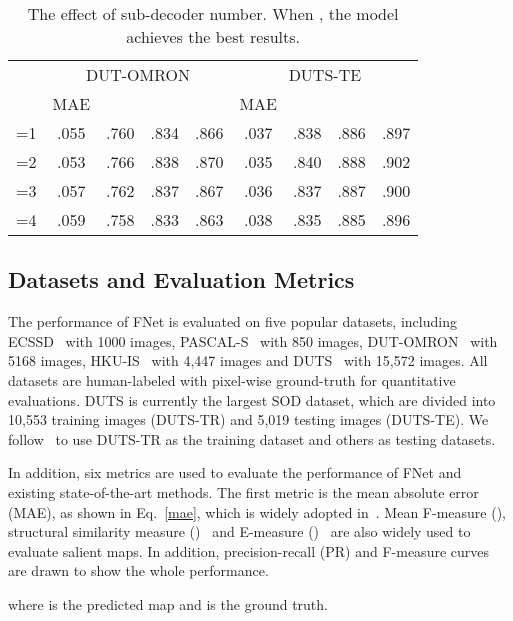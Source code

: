 \documentclass[letterpaper]{article} \usepackage{aaai20}  \usepackage{times}  \usepackage{helvet} \usepackage{courier}  \usepackage[hyphens]{url}  \usepackage{graphicx} \urlstyle{rm} \def\UrlFont{\rm}  \usepackage{graphicx}  \frenchspacing  \setlength{\pdfpagewidth}{8.5in}  \setlength{\pdfpageheight}{11in}
\begin{document}
\begin{table}[htb]
  \label{iteration}
  \renewcommand\tabcolsep{3.7pt}
  \renewcommand\arraystretch{1.1}
  \begin{tabular}{c|cccc|cccc}
    \hline
     & \multicolumn{4}{c|}{DUT-OMRON} & \multicolumn{4}{c}{DUTS-TE} \\
     & MAE &  &  &  & MAE &  &  &  \\
    \hline
    =1 & .055 & .760 & .834 & .866 & .037 & .838 & .886 & .897 \\
    =2 & .053 & .766 & .838 & .870 & .035 & .840 & .888 & .902 \\
    =3 & .057 & .762 & .837 & .867 & .036 & .837 & .887 & .900 \\
    =4 & .059 & .758 & .833 & .863 & .038 & .835 & .885 & .896 \\
    \hline
  \end{tabular}
  \caption{The effect of sub-decoder number. When , the model achieves the best results.}
\end{table}


\subsection{Datasets and Evaluation Metrics}
The performance of FNet is evaluated on five popular datasets, including ECSSD~\cite{ECSSD} with 1000 images, PASCAL-S~\cite{PASCALS} with 850 images, DUT-OMRON~\cite{DUTO} with 5168 images, HKU-IS~\cite{HKUIS} with 4,447 images and  DUTS~\cite{DUTS} with 15,572 images. All datasets are human-labeled with pixel-wise ground-truth for quantitative evaluations. DUTS is currently the largest SOD dataset, which are divided into 10,553 training images (DUTS-TR) and 5,019 testing images (DUTS-TE). We follow~\cite{CPD,BASNet} to use DUTS-TR as the training dataset and others as testing datasets. 

In addition, six metrics are used to evaluate the performance of FNet and existing state-of-the-art methods. The first metric is the mean absolute error (MAE), as shown in Eq.~\ref{mae}, which is widely adopted in~\cite{DSS,PiCANet}. Mean F-measure (), structural similarity measure ()~\cite{Smeasure} and E-measure ()~\cite{Emeasure} are also widely used to evaluate salient maps. In addition, precision-recall (PR) and F-measure curves are drawn to show the whole performance.

where  is the predicted map and  is the ground truth.
\end{document}

